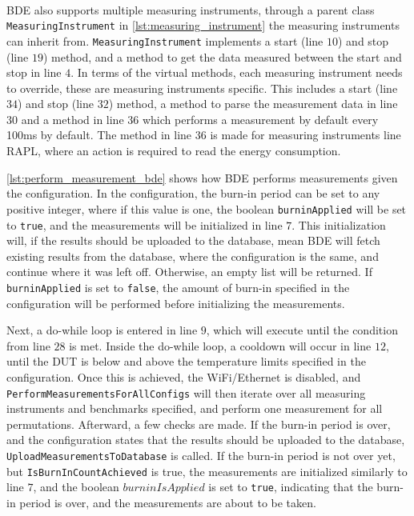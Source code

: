 

\paragraph*{}
BDE also supports multiple measuring instruments, through a parent class \texttt{MeasuringInstrument} in \cref{lst:measuring_instrument} the measuring instruments can inherit from. \texttt{MeasuringInstrument} implements a start (line $10$) and stop (line $19$) method, and a method to get the data measured between the start and stop in line $4$. In terms of the virtual methods, each measuring instrument needs to override, these are measuring instruments specific. This includes a start (line $34$) and stop (line $32$) method, a method to parse the measurement data in line $30$ and a method in line $36$ which performs a measurement by default every 100ms by default. The method in line $36$ is made for measuring instruments line RAPL, where an action is required to read the energy consumption.
\newpage



\cref{lst:perform_measurement_bde} shows how BDE performs measurements given the configuration. In the configuration, the burn-in period can be set to any positive integer, where if this value is one, the boolean \texttt{burninApplied} will be set to \texttt{true}, and the measurements will be initialized in line $7$. This initialization will, if the results should be uploaded to the database, mean BDE will fetch existing results from the database, where the configuration is the same, and continue where it was left off. Otherwise, an empty list will be returned. If \texttt{burninApplied} is set to \texttt{false}, the amount of burn-in specified in the configuration will be performed before initializing the measurements.

Next, a do-while loop is entered in line $9$, which will execute until the condition  from line $28$ is met. Inside the do-while loop, a cooldown will occur in line $12$, until the DUT is below and above the temperature limits specified in the configuration. Once this is achieved, the WiFi/Ethernet is disabled, and \texttt{PerformMeasurementsForAllConfigs} will then iterate over all measuring instruments and benchmarks specified, and perform one measurement for all permutations. Afterward, a few checks are made. If the burn-in period is over, and the configuration states that the results should be uploaded to the database, \texttt{UploadMeasurementsToDatabase} is called. If the burn-in period is not over yet, but \texttt{IsBurnInCountAchieved} is true, the measurements are initialized similarly to line $7$, and the boolean $burninIsApplied$ is set to \texttt{true}, indicating that the burn-in period is over, and the measurements are about to be taken. 
